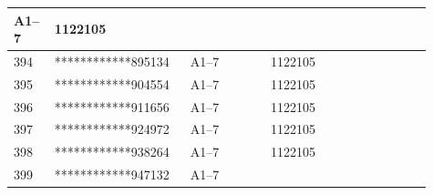 \documentclass[UTF8,10pt,a4paper,fontset=fandol]{ctexart}
\newcommand{\fieldvalue}[1]{#1}
\begin{document}
\begin{center}
\begin{tabular}{|p{0.08\linewidth}|p{0.29\linewidth}|p{0.18\linewidth}|p{0.18\linewidth}|p{0.18\linewidth}|}
\fieldvalue{A1--7}
&
\fieldvalue{1122105}
& \\ \hline
\fieldvalue{394}
&
\fieldvalue{************895134}
&
\fieldvalue{A1--7}
&
\fieldvalue{1122105}
& \\ \hline
\fieldvalue{395}
&
\fieldvalue{************904554}
&
\fieldvalue{A1--7}
&
\fieldvalue{1122105}
& \\ \hline
\fieldvalue{396}
&
\fieldvalue{************911656}
&
\fieldvalue{A1--7}
&
\fieldvalue{1122105}
& \\ \hline
\fieldvalue{397}
&
\fieldvalue{************924972}
&
\fieldvalue{A1--7}
&
\fieldvalue{1122105}
& \\ \hline
\fieldvalue{398}
&
\fieldvalue{************938264}
&
\fieldvalue{A1--7}
&
\fieldvalue{1122105}
& \\ \hline
\fieldvalue{399}
&
\fieldvalue{************947132}
&
\fieldvalue{A1--7}
&

\end{tabular}
\end{center}
\end{document}
